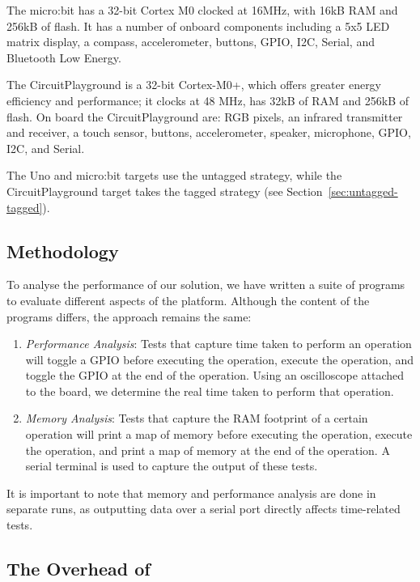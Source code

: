 The micro:bit has a 32-bit Cortex M0 clocked at 16MHz, with 16kB RAM and 256kB of flash. It has a number of onboard components including a 5x5 LED matrix display, a compass, accelerometer, buttons, GPIO, I2C, Serial, and Bluetooth Low Energy.

The CircuitPlayground is a 32-bit Cortex-M0+, which offers greater energy efficiency and performance; it clocks at 48 MHz, has 32kB of RAM and 256kB of flash. On board the CircuitPlayground are: RGB pixels, an infrared transmitter and receiver, a touch sensor, buttons, accelerometer, speaker, microphone, GPIO, I2C, and Serial.

The Uno and micro:bit \MC targets use the untagged strategy, while the CircuitPlayground target takes the tagged strategy (see Section~\ref{sec:untagged-tagged}).

\subsection{Methodology}

To analyse the performance of our solution, we have written a suite of programs to evaluate different aspects of the platform. Although the content of the programs differs, the approach remains the same:

\begin{enumerate}
    \item \textit{Performance Analysis}: Tests that capture time taken to perform an operation will toggle a GPIO before executing the operation, execute the operation, and toggle the GPIO at the end of the operation. Using an oscilloscope attached to the board, we determine the real time taken to perform that operation.

    \item \textit{Memory Analysis}: Tests that capture the RAM footprint of a certain operation will print a map of memory before executing the operation, execute the operation, and print a map of memory at the end of the operation. A serial terminal is used to capture the output of these tests.
\end{enumerate}

It is important to note that memory and performance analysis are done in separate runs, as outputting data over a serial port directly affects time-related tests.

\subsection{The Overhead of \MC}

